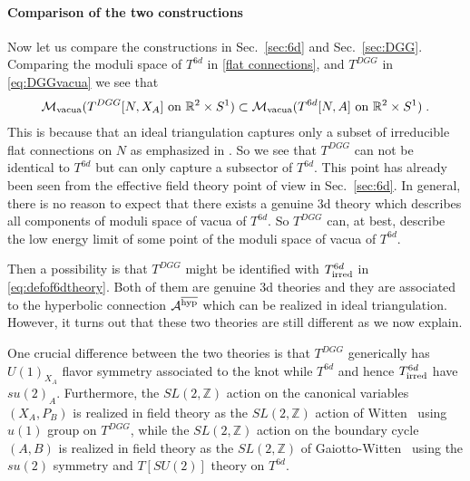 \documentclass[a4paper,11pt]{article}
\def\CA{{\cal A}}
\begin{document}
\paragraph{Comparison of the two constructions}
Now let us compare the constructions in Sec.~\ref{sec:6d} and Sec.~\ref{sec:DGG}.
Comparing the moduli space of $T^{6d}$ in \eqref{flat connections}, and $T^{DGG}$ in \eqref{eq:DGGvacua} we see that 
%
\begin{align}
\mathcal{M}_{\rm vacua}(\textrm{$T^{DGG}[N,X_A]$ on $\mathbb{R}^2\times S^1$}) \subset \mathcal{M}_{\rm vacua}(\textrm{$T^{6d}[N,A]$ on $\mathbb{R}^2\times S^1$})\;.
\end{align}
%
This is because that an ideal triangulation captures only a subset of irreducible flat connections on $N$ as emphasized in \cite{Chung:2014qpa}. So we see that $T^{DGG}$ can not be identical to  $T^{6d}$ but can only capture a subsector of $T^{6d}$. This point has already been seen
from the effective field theory point of view in Sec.~\ref{sec:6d}. In general, there is no reason to expect that there exists a genuine 3d theory
which describes all components of moduli space of vacua of $T^{6d}$. So $T^{DGG}$ can, at best, describe the low energy limit of 
some point of the moduli space of vacua of $T^{6d}$.

Then a possibility is that $T^{DGG}$ might be identified with $T^{6d}_{\rm irred}$ in \eqref{eq:defof6dtheory}.
Both of them are genuine 3d theories and they are associated to the hyperbolic connection $\CA^{\rm \overline{hyp}}$ which can be realized in
ideal triangulation. However, it turns out that these two theories are still different as we now explain.


One crucial difference between the two theories is that  $T^{DGG}$ generically has $U(1)_{X_A}$ flavor symmetry associated to the knot while 
$T^{6d}$ and hence $T^{6d}_{\rm irred}$ have $su(2)_A$. Furthermore, the $SL(2,\mathbb{Z})$ action on the canonical variables $(X_A, P_B)$ is realized in field theory
as the $SL(2,\mathbb{Z})$ action of Witten~\cite{Witten:2003ya} using $u(1)$ group on $T^{DGG}$,
while the $SL(2,\mathbb{Z})$ action on the boundary cycle $(A,B)$ is realized in field theory as the $SL(2,\mathbb{Z})$ of
Gaiotto-Witten~\cite{Gaiotto:2008ak} using the $su(2)$ symmetry and $T[SU(2)]$ theory on $T^{6d}$. 
\end{document}
